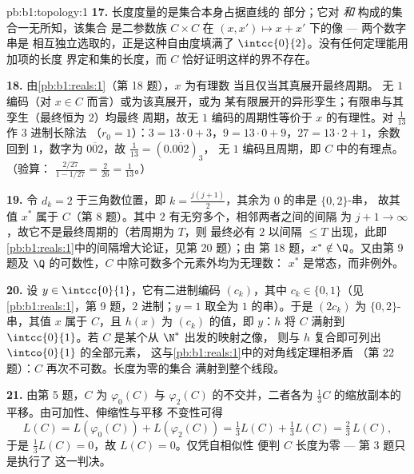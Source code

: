 \begin{solution}{pb:b1:topology:1}
\textbf{17.} 长度度量的是集合本身占据直线的
部分；它对 \emph{和} 构成的集合一无所知，该集合
是二参数族 $C \times C$ 在 $(x,
x') \mapsto x + x'$ 下的像 --- 两个数字串是
相互独立选取的，正是这种自由度填满了
$\intcc{0}{2}$。没有任何定理能用加项的长度
界定和集的长度，而 $C$ 恰好证明这样的界不存在。

\textbf{18.} 由\cref{pb:b1:reals:1}（第 18 题），$x$ 为有理数
当且仅当其真展开最终周期。
无 $1$ 编码（对 $x \in C$ 而言）或为该真展开，或为
某有限展开的异形孪生；有限串与其
孪生（最终恒为 $2$）均最终
周期，故无 $1$ 编码的周期性等价于
$x$ 的有理性。对 $\frac1{13}$ 作 $3$ 进制长除法
（$r_0 = 1$）：$3 = 13\cdot0 + 3$，$9 = 13\cdot0 + 9$，$27 =
13\cdot2 + 1$，余数回到 $1$，数字为
$\overline{002}$，故 $\frac1{13} = (0.\overline{002})_3$，
无 $1$ 编码且周期，即 $C$ 中的有理点。（验算：
$\frac{2/27}{1 - 1/27} = \frac{2}{26} = \frac1{13}$。）

\textbf{19.} 令 $d_k = 2$ 于三角数位置，即
$k = \frac{j(j+1)}{2}$，其余为 $0$ 的串是 $\{0,2\}$-串，
故其值 $x^*$ 属于 $C$（第
8 题）。其中 $2$ 有无穷多个，相邻两者之间的间隔
为 $j + 1 \to \infty$，故它不是最终周期的（若周期为 $T$，则
最终必有 $2$ 以间隔 $\leq T$ 出现，此即
\cref{pb:b1:reals:1}中的间隔增大论证，见第 20 题）；由
第 18 题，$x^* \notin \Q$。又由第 9 题及
$\Q$ 的可数性，$C$ 中除可数多个元素外均为无理数：
$x^*$ 是常态，而非例外。

\textbf{20.} 设 $y \in \intcc{0}{1}$，它有二进制编码
$(c_k)$，其中 $c_k \in \{0, 1\}$（见\cref{pb:b1:reals:1}，第
9 题，$2$ 进制；$y = 1$ 取全为 $1$ 的串）。于是 $(2c_k)$
为 $\{0,2\}$-串，其值 $x$ 属于 $C$，且 $h(x)$ 为
$(c_k)$ 的值，即 $y$：$h$ 将 $C$ 满射到
$\intcc{0}{1}$。若 $C$ 是某个从 $\N^*$ 出发的映射之像，
则与 $h$ 复合即可列出 $\intco{0}{1}$ 的全部元素，
这与\cref{pb:b1:reals:1}中的对角线定理相矛盾
（第 22 题）：$C$ 再次不可数。长度为零的集合
满射到整个线段。

\textbf{21.} 由第 5 题，$C$ 为
$\varphi_0(C)$ 与 $\varphi_2(C)$ 的不交并，二者各为
$\frac13 C$ 的缩放副本的平移。由可加性、伸缩性与平移
不变性可得
\[
L(C) = L(\varphi_0(C)) + L(\varphi_2(C))
= \tfrac13 L(C) + \tfrac13 L(C) = \tfrac23\,L(C),
\]
于是 $\frac13 L(C) = 0$，故 $L(C) = 0$。仅凭自相似性
便判 $C$ 长度为零 --- 第 3 题只是执行了
这一判决。


\end{solution}
